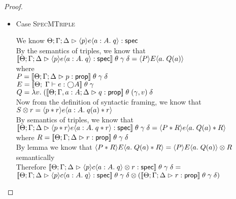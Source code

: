 \begin{proof}
\begin{itemize}
  \item Case \textsc{SpecMTriple}
    \begin{tabbedproof}
      \oo We know $\judgeS{\mspec{p}{e}{a:A}{q}}$ \\
      \oo By the semantics of triples, we know that \\
      \oox  $\interp{\judgeS{\mspec{p}{e}{a:A}{q}}}\;\theta\;\gamma\;\delta = \mspec{P}{E}{a}{Q(a)}$ \\ 
      \ox where \\
      \oox $P = \interp{\judgeA{p}{\assert}}\;\theta\;\gamma\;\delta$ \\
      \oox $E = \interp{\judgeE[\Theta]{\Gamma}{e}{\monad{A}}}\;\theta\;\gamma$ \\
      \oox $Q = \semfun{v}{(\interp{\judgeA[\Theta; \Gamma, a:A; \Delta]{q}{\assert}}\;\theta\;(\gamma, v)\;\delta}$ \\
      \oo Now from the definition of syntactic framing, we know that $\Frame{S}{r} = \mspec{p * r}{e}{a:A}{q(a) * r}$ \\
      \oo By semantics of triples, we know that \\
      \oox $\interp{\judgeS{\mspec{p * r}{e}{a:A}{q * r}}}\;\theta\;\gamma\;\delta = \mspec{P * R}{e}{a}{Q(a) * R}$ \\ 
      \ox where $R = \interp{\judgeA{r}{\assert}}\;\theta\;\gamma\;\delta$ \\
      \oo By lemma we know that $\mspec{P * R}{E}{a}{Q(a) * R} = \Frame{\mspec{P}{E}{a}{Q(a)}}{R}$ 
          semantically \\
      \oo Therefore $\interp{\judgeS{\Frame{\mspec{p}{c}{a:A}{q}}{r}}}\;\theta\;\gamma\;\delta = $ \\
      \oox $\Frame{\interp{\judgeS{\mspec{p}{c}{a:A}{q}}}\;\theta\;\gamma\;\delta}{(\interp{\judgeA{r}{\assert}}\;\theta\;\gamma\;\delta)}$
    \end{tabbedproof}


\end{itemize}
\end{proof}

